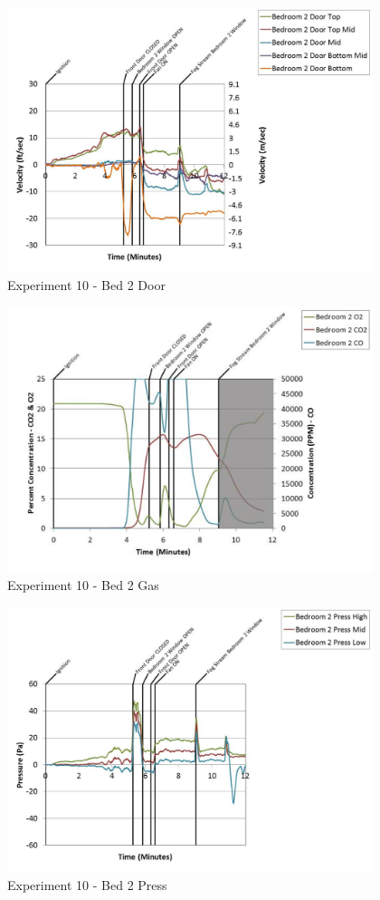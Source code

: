\documentclass{article}
\begin{document}
\begin{appendices}
	\begin{figure}[h!]
		\centering
		\includegraphics[height=3.05in]{0_Images/Results_Charts/Exp_10_Charts/Bed2Door.pdf}
		\caption{Experiment 10 - Bed 2 Door}
	\end{figure}
 
	\clearpage

	\begin{figure}[h!]
		\centering
		\includegraphics[height=3.05in]{0_Images/Results_Charts/Exp_10_Charts/Bed2Gas.pdf}
		\caption{Experiment 10 - Bed 2 Gas}
	\end{figure}
 

	\begin{figure}[h!]
		\centering
		\includegraphics[height=3.05in]{0_Images/Results_Charts/Exp_10_Charts/Bed2Press.pdf}
		\caption{Experiment 10 - Bed 2 Press}
	\end{figure}
 

\end{appendices}
\end{document}
